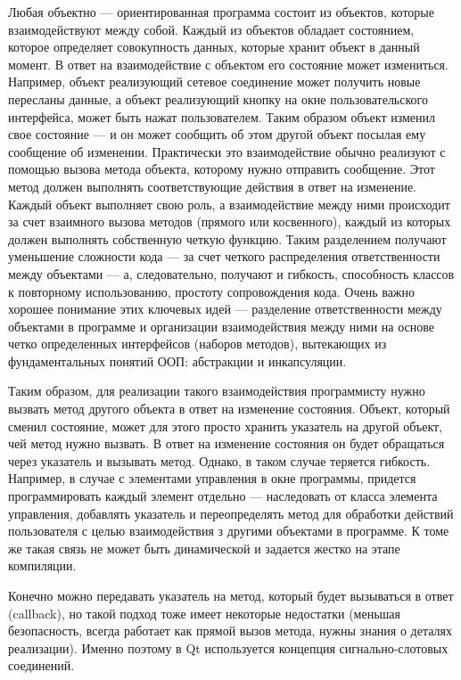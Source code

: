 Любая объектно --- ориентированная программа состоит из объектов, которые взаимодействуют между собой. Каждый из объектов
обладает состоянием, которое определяет совокупность данных, которые хранит объект в данный момент. В ответ на
взаимодействие с объектом его состояние может измениться. Например, объект реализующий сетевое соединение может
получить новые пересланы данные, а объект реализующий кнопку на окне пользовательского интерфейса, может быть нажат
пользователем. Таким образом объект изменил свое состояние --- и он может сообщить об этом другой объект посылая ему
сообщение об изменении. Практически это взаимодействие обычно реализуют с помощью вызова метода объекта, которому нужно
отправить сообщение. Этот метод должен выполнять соответствующие действия в ответ на изменение. Каждый объект выполняет
свою роль, а взаимодействие между ними происходит за счет взаимного вызова методов (прямого или косвенного), каждый из
которых должен выполнять собственную четкую функцию. Таким разделением получают уменьшение сложности кода --- за счет
четкого распределения ответственности между объектами --- а, следовательно, получают и гибкость, способность классов к
повторному использованию, простоту сопровождения кода. Очень важно хорошее понимание этих ключевых идей ---
разделение ответственности между объектами в программе и организации взаимодействия между ними на основе четко
определенных интерфейсов (наборов методов), вытекающих из фундаментальных понятий ООП: абстракции и инкапсуляции.

Таким образом, для реализации такого взаимодействия программисту нужно вызвать метод другого объекта в ответ на
изменение состояния. Объект, который сменил состояние, может для этого просто хранить указатель на другой объект, чей
метод нужно вызвать. В ответ на изменение состояния он будет обращаться через указатель и вызывать метод. Однако, в
таком случае теряется гибкость. Например, в случае с элементами управления в  окне программы, придется программировать
каждый элемент отдельно --- наследовать от класса элемента управления, добавлять указатель и  переопределять метод для
обработки действий пользователя с целью взаимодействия з другими объектами в программе. К томе же такая связь не может
быть динамической и задается жестко на этапе компиляции.

Конечно можно передавать указатель на метод, который будет вызываться в ответ (callback), но такой подход тоже имеет
некоторые недостатки (меньшая безопасность, всегда работает как прямой вызов метода, нужны знания о деталях
реализации). Именно поэтому в Qt используется концепция сигнально-слотовых соединений.


